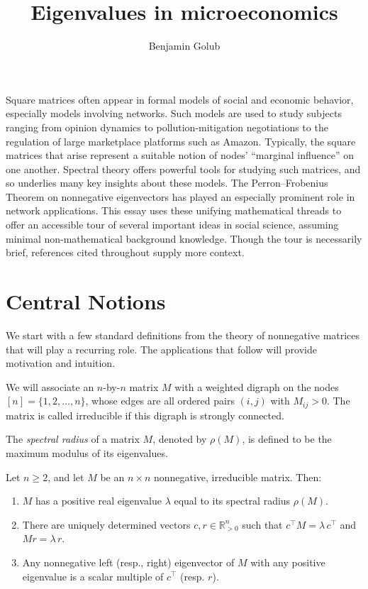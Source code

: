 \documentclass{notices}
\title{
Eigenvalues in microeconomics
}
\author{
  Benjamin Golub
  \affil{
    The  author is a professor of economics and computer science at Northwestern. His email address is bgolub@northwestern.edu.
    }
}
\theoremstyle{definition}\newtheorem{problem}{Problem}
\begin{document}
\maketitle

Square matrices often appear in formal models of social and economic behavior, especially models involving networks. Such models are used to study subjects ranging from opinion dynamics to pollution-mitigation negotiations to the regulation of large marketplace platforms such as Amazon.  Typically, the square matrices that arise represent a suitable notion of nodes' ``marginal influence'' on one another. Spectral theory offers powerful tools for studying such matrices, and so underlies many key insights about these models. The Perron--Frobenius Theorem on nonnegative eigenvectors has played an especially prominent role in network applications. This essay uses these unifying mathematical threads to offer an accessible tour of several important ideas in social science, assuming minimal non-mathematical background knowledge. Though the tour is necessarily brief, references cited throughout supply more context.



\section*{Central Notions}

We start with a few standard definitions from the theory of nonnegative matrices that will play a recurring role. The applications that follow will provide motivation and intuition.

We will associate an $n$-by-$n$ matrix $M$ with a weighted digraph on the nodes \([n]=\{1,2,\ldots,n\}\), whose edges are all ordered pairs \((i,j)\) with \(M_{ij} > 0\). The matrix is called irreducible if this digraph is strongly connected. 

The \emph{spectral radius} of a matrix $M$, denoted by $\rho(M)$, is defined to be the maximum modulus of its eigenvalues.

\begin{thmNoNum}
Let \(n \ge 2\), and let \(M\) be an \(n\times n\) nonnegative, irreducible matrix. Then:
\begin{enumerate}
    \item \(M\) has a positive real eigenvalue \(\lambda\) equal to its spectral radius \(\rho(M)\).
    \item There are uniquely determined vectors \(c, r \in \mathbb{R}^n_{>0}\) such that \(c^\top M = \lambda\,c^\top\) and \(Mr = \lambda\,r\).
    \item Any nonnegative left (resp., right) eigenvector of \(M\) with any positive eigenvalue is a scalar multiple of \(c^\top\) (resp. \(r\)).
\end{enumerate}
\end{thmNoNum}
\end{document}
